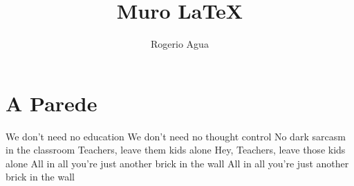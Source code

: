 \documentclass[12pt]{utfpr-pg}
\title{Muro \LaTeX}
\author{Rogerio Agua}
\begin{document}
\maketitle

\chapter{A Parede}

We don't need no education
\newline
We don't need no thought control
\newline
No dark sarcasm in the classroom
\newline
Teachers, leave them kids alone
\newline
Hey, Teachers, leave those kids alone
\newline
All in all you're just another brick in the wall
\newline
All in all you're just another brick in the wall
\end{document}

